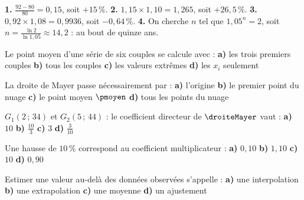 \begin{corrige}[pourcentages]
\textbf{1.} $\frac{92-80}{80} = 0{,}15$, soit $+15\,\%$.
\textbf{2.} $1{,}15\times1{,}10 = 1{,}265$, soit $+26{,}5\,\%$.
\textbf{3.} $0{,}92\times1{,}08 = 0{,}9936$, soit $-0{,}64\,\%$.
\textbf{4.} On cherche $n$ tel que $1{,}05^{n} = 2$, soit
$n = \frac{\ln2}{\ln1{,}05} \approx 14{,}2$ : au bout de quinze ans.
\end{corrige}

\begin{qcm}
\exo Le point moyen d'une série de six couples se calcule avec :
\textbf{a)} les trois premiers couples \quad \textbf{b)} tous les couples
\quad \textbf{c)} les valeurs extrêmes \quad \textbf{d)} les $x_{i}$
seulement 

\exo La droite de Mayer passe nécessairement par :
\textbf{a)} l'origine \quad \textbf{b)} le premier point du nuage \quad
\textbf{c)} le point moyen $\pmoyen$ \quad \textbf{d)} tous les points du
nuage 

\exo $G_{1}(2\,;\,34)$ et $G_{2}(5\,;\,44)$ : le coefficient directeur de
$\droiteMayer$ vaut :
\textbf{a)} $10$ \quad \textbf{b)} $\frac{10}{3}$ \quad \textbf{c)} $3$
\quad \textbf{d)} $\frac{3}{10}$ 

\exo Une hausse de $10\,\%$ correspond au coefficient multiplicateur :
\textbf{a)} $0{,}10$ \quad \textbf{b)} $1{,}10$ \quad \textbf{c)} $10$
\quad \textbf{d)} $0{,}90$ 

\exo Estimer une valeur au-delà des données observées s'appelle :
\textbf{a)} une interpolation \quad \textbf{b)} une extrapolation \quad
\textbf{c)} une moyenne \quad \textbf{d)} un ajustement 
\end{qcm}

